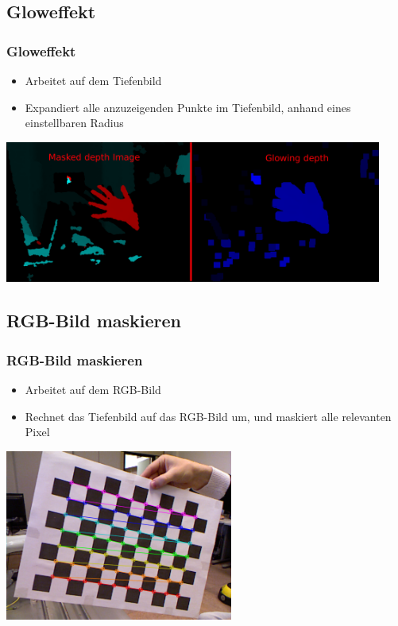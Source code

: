 \documentclass[compress]{beamer}
\begin{document}
\subsection{Gloweffekt}
\begin{frame}
\frametitle{Gloweffekt}
\begin{itemize}
	\item Arbeitet auf dem Tiefenbild
	\item Expandiert alle anzuzeigenden Punkte im Tiefenbild, anhand eines einstellbaren Radius
\end{itemize}
\vspace*{0.5cm}
\includegraphics[width=12.4cm]{filter3.png}
\end{frame}

\subsection{RGB-Bild maskieren}
\begin{frame}
\frametitle{RGB-Bild maskieren}
\begin{itemize}
	\item Arbeitet auf dem RGB-Bild
	\item Rechnet das Tiefenbild auf das RGB-Bild um, und maskiert alle relevanten Pixel
\end{itemize}

\hspace*{2.2cm}\includegraphics[width=7.5cm]{trans.png}
\end{frame}
\end{document}
